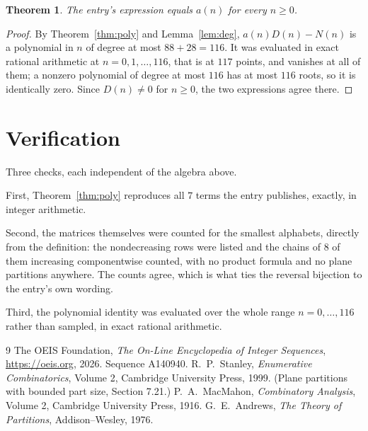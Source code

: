 \documentclass[11pt,a4paper]{article}
\theoremstyle{plain}
\newtheorem{theorem}{Theorem}
\theoremstyle{definition}
\begin{document}
\begin{theorem}
The entry's expression equals $a(n)$ for every $n\ge0$.
\end{theorem}

\begin{proof}
By Theorem~\ref{thm:poly} and Lemma~\ref{lem:deg}, $a(n)D(n)-N(n)$ is a polynomial in $n$
of degree at most $88+28=116$. It was evaluated in exact rational arithmetic at
$n=0,1,\dots,116$, that is at $117$ points, and vanishes at all of them; a nonzero polynomial
of degree at most $116$ has at most $116$ roots, so it is identically zero. Since $D(n)\neq0$
for $n\ge0$, the two expressions agree there.
\end{proof}

\section{Verification}

Three checks, each independent of the algebra above.

First, Theorem~\ref{thm:poly} reproduces all $7$ terms the entry publishes,
exactly, in integer arithmetic.

Second, the matrices themselves were counted for the smallest alphabets, directly from the
definition: the nondecreasing rows were listed and the chains of $8$ of them increasing
componentwise counted, with no product formula and no plane partitions anywhere. The counts
agree, which is what ties the reversal bijection to the entry's own wording.

Third, the polynomial identity was evaluated over the whole range $n=0,\dots,116$ rather than
sampled, in exact rational arithmetic.

\begin{thebibliography}{9}
 The OEIS Foundation, \emph{The On-Line Encyclopedia of Integer
Sequences}, \url{https://oeis.org}, 2026. Sequence A140940.
 R.~P.~Stanley, \emph{Enumerative Combinatorics}, Volume 2, Cambridge
University Press, 1999. (Plane partitions with bounded part size, Section 7.21.)
 P.~A.~MacMahon, \emph{Combinatory Analysis}, Volume 2, Cambridge
University Press, 1916.
 G.~E.~Andrews, \emph{The Theory of Partitions}, Addison--Wesley, 1976.
\end{thebibliography}
\end{document}
